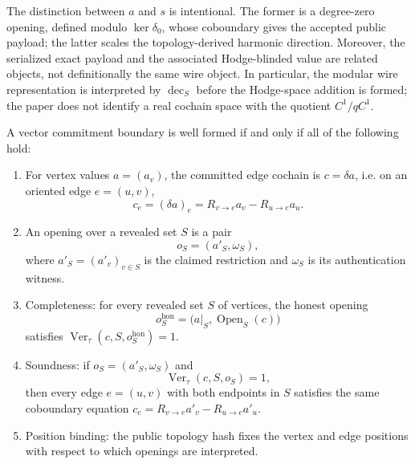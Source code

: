 The distinction between \(a\) and \(s\) is intentional.  The former is a
degree-zero opening, defined modulo \(\ker\delta_0\), whose coboundary gives
the accepted public payload; the
latter scales the topology-derived harmonic direction.  Moreover, the
serialized exact payload and the associated Hodge-blinded value are related
objects, not definitionally the same wire object. In particular, the modular
wire representation is interpreted by \(\operatorname{dec}_S\) before the
Hodge-space addition is formed; the paper does not identify a real cochain
space with the quotient \(C^1/qC^1\).

\begin{definition}\label{def:vector-commitment-boundary}
  A vector commitment boundary is well formed if and only if all of the
  following hold:
  \begin{enumerate}[label=(\roman*)]
    \item For vertex values \(a=(a_v)\), the committed edge cochain is
      \(c=\delta a\), i.e. on an oriented edge \(e=(u,v)\),
      \[
        c_e=(\delta a)_e=R_{v\to e}a_v-R_{u\to e}a_u .
      \]
    \item An opening over a revealed set \(S\) is a pair
      \[
        o_S=(a'_S,\omega_S),
      \]
      where \(a'_S=(a'_v)_{v\in S}\) is the claimed restriction and
      \(\omega_S\) is its authentication witness.
    \item Completeness: for every revealed set \(S\) of vertices, the honest
      opening
      \[
        o_S^{\mathrm{hon}}
        =\bigl(a|_S,\operatorname{Open}_S(c)\bigr)
      \]
      satisfies \(\operatorname{Ver}_\tau(c,S,o_S^{\mathrm{hon}})=1\).
    \item Soundness: if \(o_S=(a'_S,\omega_S)\) and
      \[
        \operatorname{Ver}_\tau(c,S,o_S)=1,
      \]
      then every edge \(e=(u,v)\) with both endpoints in \(S\) satisfies
      the same coboundary equation
      \(c_e=R_{v\to e}a'_v-R_{u\to e}a'_u\).
    \item Position binding: the public topology hash fixes the vertex and edge
      positions with respect to which openings are interpreted.
  \end{enumerate}
\end{definition}

